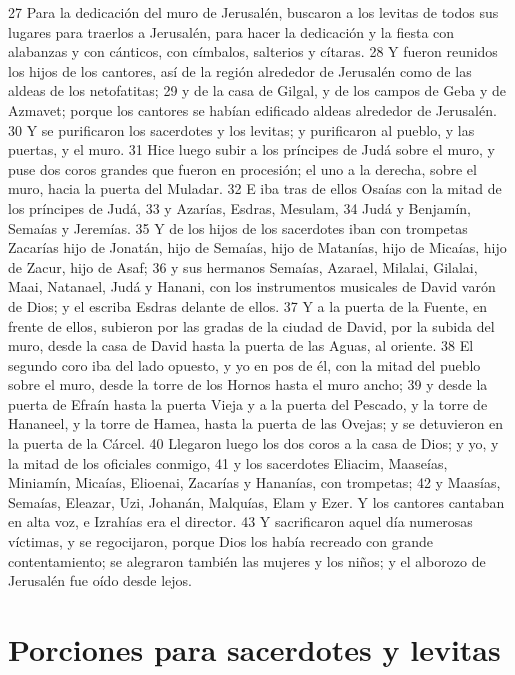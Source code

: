 27 Para la dedicación del muro de Jerusalén, buscaron a los levitas de todos sus lugares para traerlos a Jerusalén, para hacer la dedicación y la fiesta con alabanzas y con cánticos, con címbalos, salterios y cítaras.
28 Y fueron reunidos los hijos de los cantores, así de la región alrededor de Jerusalén como de las aldeas de los netofatitas; 
29 y de la casa de Gilgal, y de los campos de Geba y de Azmavet; porque los cantores se habían edificado aldeas alrededor de Jerusalén.
30 Y se purificaron los sacerdotes y los levitas; y purificaron al pueblo, y las puertas, y el muro.
31 Hice luego subir a los príncipes de Judá sobre el muro, y puse dos coros grandes que fueron en procesión; el uno a la derecha, sobre el muro, hacia la puerta del Muladar.
32 E iba tras de ellos Osaías con la mitad de los príncipes de Judá,
33 y Azarías, Esdras, Mesulam,
34 Judá y Benjamín, Semaías y Jeremías.
35 Y de los hijos de los sacerdotes iban con trompetas Zacarías hijo de Jonatán, hijo de Semaías, hijo de Matanías, hijo de Micaías, hijo de Zacur, hijo de Asaf;
36 y sus hermanos Semaías, Azarael, Milalai, Gilalai, Maai, Natanael, Judá y Hanani, con los instrumentos musicales de David varón de Dios; y el escriba Esdras delante de ellos.
37 Y a la puerta de la Fuente, en frente de ellos, subieron por las gradas de la ciudad de David, por la subida del muro, desde la casa de David hasta la puerta de las Aguas, al oriente.
38 El segundo coro iba del lado opuesto, y yo en pos de él, con la mitad del pueblo sobre el muro, desde la torre de los Hornos hasta el muro ancho;
39 y desde la puerta de Efraín hasta la puerta Vieja y a la puerta del Pescado, y la torre de Hananeel, y la torre de Hamea, hasta la puerta de las Ovejas; y se detuvieron en la puerta de la Cárcel.
40 Llegaron luego los dos coros a la casa de Dios; y yo, y la mitad de los oficiales conmigo,
41 y los sacerdotes Eliacim, Maaseías, Miniamín, Micaías, Elioenai, Zacarías y Hananías, con trompetas;
42 y Maasías, Semaías, Eleazar, Uzi, Johanán, Malquías, Elam y Ezer. Y los cantores cantaban en alta voz, e Izrahías era el director.
43 Y sacrificaron aquel día numerosas víctimas, y se regocijaron, porque Dios los había recreado con grande contentamiento; se alegraron también las mujeres y los niños; y el alborozo de Jerusalén fue oído desde lejos.

\section*{Porciones para sacerdotes y levitas}

